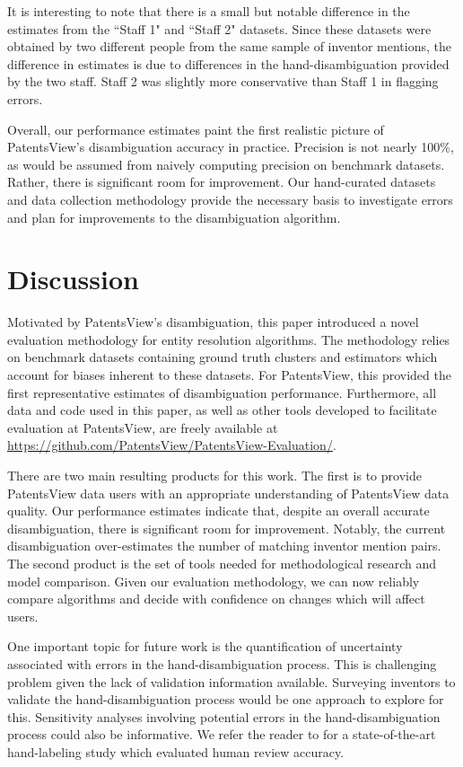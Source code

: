 \documentclass[fontsize=11pt]{article}
\newcommand{\ob}[1]{{\color{purple}#1}}
\theoremstyle{definition}
\begin{document}
It is interesting to note that there is a small but notable difference in the estimates from the ``Staff 1" and ``Staff 2" datasets. Since these datasets were obtained by two different people from the same sample of inventor mentions, the difference in estimates is due to differences in the hand-disambiguation provided by the two staff. Staff 2 was slightly more conservative than Staff 1 in flagging errors.

Overall, our performance estimates paint the first realistic picture of PatentsView's disambiguation accuracy in practice. Precision is not nearly 100\%, as would be assumed from naively computing precision on benchmark datasets. Rather, there is significant room for improvement. Our hand-curated datasets and data collection methodology provide the necessary basis to investigate errors and plan for improvements to the disambiguation algorithm.

\section{Discussion}\label{sec:discussion}

Motivated by PatentsView's disambiguation, this paper introduced a novel evaluation methodology for entity resolution algorithms. The methodology relies on benchmark datasets containing ground truth clusters and estimators which account for biases inherent to these datasets. For PatentsView, this provided the first representative estimates of disambiguation performance. Furthermore, all data and code used in this paper, as well as other tools developed to facilitate evaluation at PatentsView, are freely available at \hyperref[https://github.com/PatentsView/PatentsView-Evaluation/]{https://github.com/PatentsView/PatentsView-Evaluation/}.

There are two main resulting products for this work. The first is to provide PatentsView data users with an appropriate understanding of PatentsView data quality. Our performance estimates indicate that, despite an overall accurate disambiguation, there is significant room for \ob{improvement. Notably, the current disambiguation over-estimates the number of matching inventor mention pairs.} The second product is the set of tools needed for methodological research and model comparison. Given our evaluation methodology, we can now reliably compare algorithms and decide with confidence on changes which will affect users.

{One important topic for future work is the quantification of uncertainty associated with errors in the hand-disambiguation process. This is challenging problem given the lack of validation information available. Surveying inventors to validate the hand-disambiguation process would be one approach to explore for this. Sensitivity analyses involving potential errors in the hand-disambiguation process could also be informative. We refer the reader to \citep{bailey2017well} for a state-of-the-art hand-labeling study which evaluated human review accuracy.}
\end{document}

